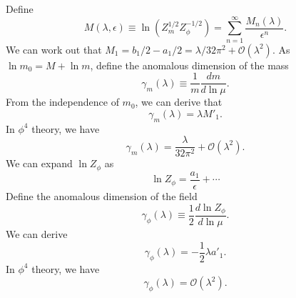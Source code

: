 Define
\[M(\lambda,\epsilon) \equiv \ln(Z_{m}^{1/2} Z_{\phi}^{-1/2}) = \sum_{n=1}^{\infty} \frac{M_n(\lambda)}{\epsilon^n}.\]
We can work out that $M_1 = b_1/2 - a_1/2 = {\lambda}/{32\pi^2} + \mathcal{O}(\lambda^2)$.
As $\ln m_0 = M + \ln m $, define the anomalous dimension of the mass
\[\gamma_m(\lambda) \equiv \frac{1}{m} \frac{dm}{d \ln \mu}.\]
From the independence of $m_0$, we can derive that
\[\gamma_m(\lambda) = \lambda M'_1.\]
In $\phi^4$ theory, we have
\[\gamma_m(\lambda) = \frac{\lambda}{32\pi^2} + \mathcal{O}(\lambda^2).\]
We can expand $\ln Z_{\phi}$ as
\[\ln Z_{\phi} = \frac{a_1}{\epsilon} + \cdots \]
Define the anomalous dimension of the field
\[\gamma_{\phi}(\lambda) \equiv \frac{1}{2} \frac{d\ln Z_{\phi}}{d \ln \mu}.\]
We can derive
\[\gamma_{\phi}(\lambda) = -\frac{1}{2}\lambda a'_1.\]
In $\phi^4$ theory, we have
\[\gamma_{\phi}(\lambda) = \mathcal{O}(\lambda^2).\]

